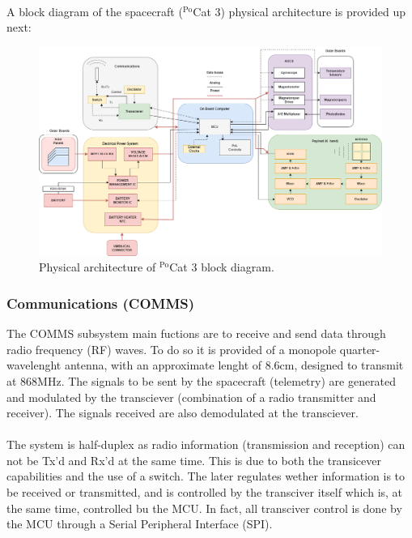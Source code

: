 \paragraph{}
A block diagram of the spacecraft ($^{\text{Po}}$Cat 3) physical architecture is 
provided up next:
\begin{figure}[H]
    \centering
    \includegraphics[width=0.8\linewidth]{res/img/1_introduction/1-PhysicalArchitectureBD.png}
    \caption{Physical architecture of $^{\text{Po}}$Cat 3 block diagram.}
    \label{fig:physarch-bd}
\end{figure}

\subsubsection{Communications (COMMS)}
The COMMS subsystem main fuctions are to receive and send data through radio
frequency (RF) waves. To do so it is provided of a monopole quarter-wavelenght
antenna, with an approximate lenght of 8.6cm, designed to transmit at 868MHz.
The signals to be sent by the spacecraft (telemetry) are generated and modulated 
by the transciever (combination of a radio transmitter and receiver). The signals
received are also demodulated at the transciever.

\paragraph{}

The system is half-duplex as radio information (transmission and reception) can
not be Tx'd and Rx'd at the same time. This is due to both the transicever 
capabilities and the use of a switch. The later regulates wether information 
is to be received or transmitted, and is controlled by the transciver itself
which is, at the same time, controlled bu the MCU. In fact, all transciver 
control is done by the MCU through a Serial Peripheral Interface (SPI).

